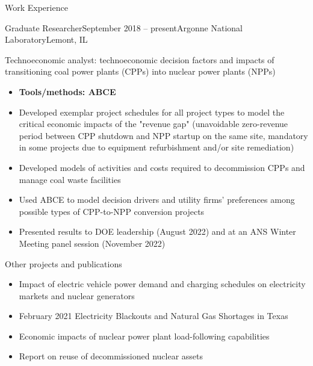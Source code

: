 \documentclass{resume} %
\begin{document}
\begin{rSection}{Work Experience}
\begin{rSubsection}{Graduate Researcher}{September 2018 -- present}{Argonne National Laboratory}{Lemont, IL}
  \item Technoeconomic analyst: technoeconomic decision factors and impacts of transitioning coal power plants (CPPs) into nuclear power plants (NPPs)
  \begin{itemize}
    \setlength{\itemsep}{-3pt}
    \item \textbf{Tools/methods: ABCE}
    \item Developed exemplar project schedules for all project types to model the critical economic impacts of the "revenue gap" (unavoidable zero-revenue period between CPP shutdown and NPP startup on the same site, mandatory in some projects due to equipment refurbishment and/or site remediation)
    \item Developed models of activities and costs required to decommission CPPs and manage coal waste facilities
    \item Used ABCE to model decision drivers and utility firms' preferences among possible types of CPP-to-NPP conversion projects
    \item Presented results to DOE leadership (August 2022) and at an ANS Winter Meeting panel session (November 2022)
  \end{itemize}

  \item Other projects and publications
  \begin{itemize}
    \item Impact of electric vehicle power demand and charging schedules on electricity markets and nuclear generators
    \item February 2021 Electricity Blackouts and Natural Gas Shortages in Texas
    \item Economic impacts of nuclear power plant load-following capabilities
    \item Report on reuse of decommissioned nuclear assets
  \end{itemize}

\end{rSubsection}


\end{rSection}
\end{document}
